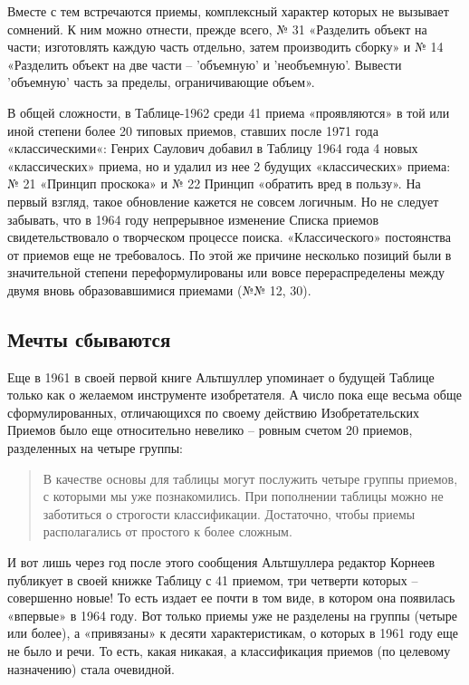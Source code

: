 \documentclass[11pt,a4paper]{article}
\begin{document}
Вместе с тем встречаются приемы, комплексный характер которых не вызывает
сомнений. К ним можно отнести, прежде всего, № 31 «Разделить объект на части;
изготовлять каждую часть отдельно, затем производить сборку» и № 14 «Разделить
объект на две части -- 'объемную' и 'необъемную'. Вывести 'объемную' часть за
пределы, ограничивающие объем».

В общей сложности, в Таблице-1962 среди 41 приема «проявляются» в той или иной
степени более 20 типовых приемов, ставших после 1971 года «классическими«:
Генрих Саулович добавил в Таблицу 1964 года 4 новых «классических» приема, но
и удалил из нее 2 будущих «классических» приема: № 21 «Принцип проскока» и №
22 Принцип «обратить вред в пользу». На первый взгляд, такое обновление
кажется не совсем логичным. Но не следует забывать, что в 1964 году
непрерывное изменение Списка приемов свидетельствовало о творческом процессе
поиска. «Классического» постоянства от приемов еще не требовалось. По этой же
причине несколько позиций были в значительной степени переформулированы или
вовсе перераспределены между двумя вновь образовавшимися приемами (№№ 12,
30). 

\subsection*{Мечты сбываются}

Еще в 1961 в своей первой книге Альтшуллер упоминает о будущей Таблице только
как о желаемом инструменте изобретателя. А число пока еще весьма обще
сформулированных, отличающихся по своему действию Изобретательских Приемов
было еще относительно невелико -- ровным счетом 20 приемов, разделенных на
четыре группы:
\begin{quote}
  В качестве основы для таблицы могут послужить четыре группы приемов, с
  которыми мы уже познакомились. При пополнении таблицы можно не заботиться о
  строгости классификации. Достаточно, чтобы приемы располагались от простого
  к более сложным.
\end{quote}

И вот лишь через год после этого сообщения Альтшуллера редактор Корнеев
публикует в своей книжке Таблицу с 41 приемом, три четверти которых --
совершенно новые! То есть издает ее почти в том виде, в котором она появилась
«впервые» в 1964 году. Вот только приемы уже не разделены на группы (четыре
или более), а «привязаны» к десяти характеристикам, о которых в 1961 году еще
не было и речи. То есть, какая никакая, а классификация приемов (по целевому
назначению) стала очевидной.
\end{document}
